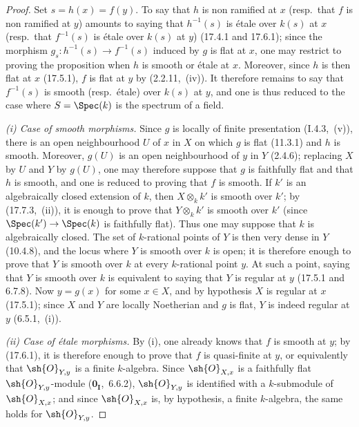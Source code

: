 \begin{proof}
Set $s=h(x)=f(y)$.
To say that $h$ is non ramified at $x$ (resp.\ that $f$ is non ramified at $y$) amounts to saying that $h^{-1}(s)$ is \'etale over $k(s)$ at $x$ (resp.\ that $f^{-1}(s)$ is \'etale over $k(s)$ at $y$) (17.4.1 and 17.6.1); since the morphism $g_s:h^{-1}(s)\to f^{-1}(s)$ induced by $g$ is flat at $x$, one may restrict to proving the proposition when $h$ is smooth or \'etale at $x$.
Moreover, since $h$ is then flat at $x$ (17.5.1), $f$ is flat at $y$ by (2.2.11,~(iv)).
It therefore remains to say that $f^{-1}(s)$ is smooth (resp.\ \'etale) over $k(s)$ at $y$, and one is thus reduced to the case where $S=\Spec(k)$ is the spectrum of a field.

\emph{(i) Case of smooth morphisms.}
Since $g$ is locally of finite presentation (I.4.3,~(v)), there is an open neighbourhood $U$ of $x$ in $X$ on which $g$ is flat (11.3.1) and $h$ is smooth.
Moreover, $g(U)$ is an open neighbourhood of $y$ in $Y$ (2.4.6); replacing $X$ by $U$ and $Y$ by $g(U)$, one may therefore suppose that $g$ is faithfully flat and that $h$ is smooth, and one is reduced to proving that $f$ is smooth.
If $k'$ is an algebraically closed extension of $k$, then $X\otimes_k k'$ is smooth over $k'$; by (17.7.3,~(ii)), it is enough to prove that $Y\otimes_k k'$ is smooth over $k'$ (since $\Spec(k')\to\Spec(k)$ is faithfully flat).
Thus one may suppose that $k$ is algebraically closed.
The set of $k$-rational points of $Y$ is then very dense in $Y$ (10.4.8), and the locus where $Y$ is smooth over $k$ is open; it is therefore enough to prove that $Y$ is smooth over $k$ at every $k$-rational point $y$.
At such a point, saying that $Y$ is smooth over $k$ is equivalent to saying that $Y$ is regular at $y$ (17.5.1 and 6.7.8).
Now $y=g(x)$ for some $x\in X$, and by hypothesis $X$ is regular at $x$ (17.5.1); since $X$ and $Y$ are locally Noetherian and $g$ is flat, $Y$ is indeed regular at $y$ (6.5.1,~(i)).


\emph{(ii) Case of \'etale morphisms.}
By (i), one already knows that $f$ is smooth at $y$; by (17.6.1), it is therefore enough to prove that $f$ is quasi-finite at $y$, or equivalently that $\sh{O}_{Y,y}$ is a finite $k$-algebra.
Since $\sh{O}_{X,x}$ is a faithfully flat $\sh{O}_{Y,y}$-module ($\mathbf{0}_\mathbf{I}$,~6.6.2), $\sh{O}_{Y,y}$ is identified with a $k$-submodule of $\sh{O}_{X,x}$; and since $\sh{O}_{X,x}$ is, by hypothesis, a finite $k$-algebra, the same holds for $\sh{O}_{Y,y}$.
\end{proof}

